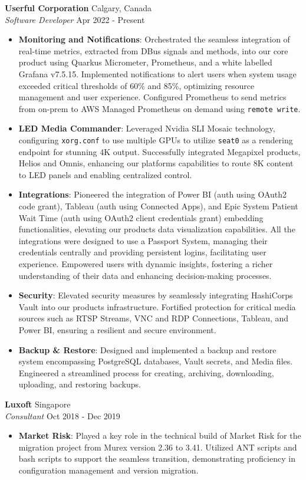 \documentclass[a4paper]{article}
\newcommand{\resumeHeadingExperience}[4]{
    \textbf{#1} \hfill {#2}\\
    \textit{#3} \hfill {#4}\\
    \vspace{-3mm}
}
\newcommand{\resumeItemExperience}[2]{
  \item{
    \begin{justify}
    \setlength{\rightskip}{0.15in} \textbf{#1}{: #2 \vspace{-2pt}}
    \end{justify}
  }
}
\begin{document}
\resumeHeadingExperience {Userful Corporation} {Calgary, Canada} {Software Developer} {Apr 2022 - Present}
\begin{itemize} \itemsep 1pt
    \resumeItemExperience {Monitoring and Notifications}{Orchestrated the seamless integration of real-time metrics, extracted from DBus signals and methods, into our core product using Quarkus Micrometer, Prometheus, and a white labelled Grafana v7.5.15. Implemented notifications to alert users when system usage exceeded critical thresholds of 60\% and 85\%, optimizing resource management and user experience. Configured Prometheus to send metrics from on-prem to AWS Managed Prometheus on demand using \texttt{remote write}.}
    \resumeItemExperience {LED Media Commander} {Leveraged Nvidia SLI Mosaic technology, configuring \texttt{xorg.conf} to use multiple GPUs to utilize \texttt{seat0} as a rendering endpoint for stunning 4K output. Successfully integrated Megapixel products, Helios and Omnis, enhancing our platform\textquotesingle{}s capabilities to route 8K content to LED panels and enabling centralized control.}
    \resumeItemExperience{Integrations} {Pioneered the integration of Power BI (auth using OAuth2 code grant), Tableau (auth using Connected Apps), and Epic System Patient Wait Time (auth using OAuth2 client credentials grant) embedding functionalities, elevating our product\textquotesingle{}s data visualization capabilities. All the integrations were designed to use a \textquotesingle{}Passport System\textquotesingle{}, managing their credentials centrally and providing persistent logins, facilitating user experience. Empowered users with dynamic insights, fostering a richer understanding of their data and enhancing decision-making processes.}
    \resumeItemExperience{Security} {Elevated security measures by seamlessly integrating HashiCorp\textquotesingle{}s Vault into our product\textquotesingle{}s infrastructure. Fortified protection for critical media sources such as RTSP Streams, VNC and RDP Connections, Tableau, and Power BI, ensuring a resilient and secure environment.}
    \resumeItemExperience{Backup \& Restore} {Designed and implemented a backup and restore system encompassing PostgreSQL databases, Vault secrets, and Media files. Engineered a streamlined process for creating, archiving, downloading, uploading, and restoring backups.}
\end{itemize}

\resumeHeadingExperience {Luxoft} {Singapore} {Consultant} {Oct 2018 - Dec 2019}
\begin{itemize} \itemsep 1pt
    \resumeItemExperience{Market Risk} {Played a key role in the technical build of Market Risk for the migration project from Murex version 2.36 to 3.41. Utilized ANT scripts and bash scripts to support the seamless transition, demonstrating proficiency in configuration management and version migration.}
\end{itemize}
\end{document}
